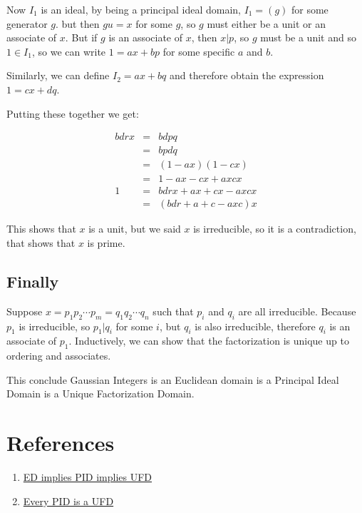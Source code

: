 \documentclass{article}
\begin{document}
Now $ I_1 $ is an ideal, by being a principal ideal domain, $ I_1 = (g) $ for some generator $ g $. but then $ gu = x $ for some $ g $, so $ g $ must either be a unit or an associate of $ x $. But if $ g $ is an associate of $ x $, then $ x | p $, so $ g $ must be a unit and so $ 1 \in I_1 $, so we can write $ 1 = ax + bp $ for some specific $ a $ and $ b $.

Similarly, we can define $ I_2 = {ax + bq} $ and therefore obtain the expression $ 1 = cx + dq $.

Putting these together we get:

\begin{eqnarray*}
  bdrx &=& bdpq                  \\
       &=& bpdq                  \\
       &=& (1-ax)(1-cx)          \\
       &=& 1 - ax - cx + axcx    \\
     1 &=& bdrx + ax + cx - axcx \\
       &=& (bdr + a + c - axc)x
\end{eqnarray*}

This shows that $ x $ is a unit, but we said $ x $ is irreducible, so it is a contradiction, that shows that $ x $ is prime.

\subsection*{Finally}
Suppose $ x = p_1 p_2 \cdots p_m = q_1 q_2 \cdots q_n $ such that $ p_i $ and $ q_i $ are all irreducible. Because $ p_1 $ is irreducible, so $ p_1 | q_i $ for some $ i $, but $ q_i $ is also irreducible, therefore $ q_i $ is an associate of $ p_1 $. Inductively, we can show that the factorization is unique up to ordering and associates.

This conclude Gaussian Integers is an Euclidean domain is a Principal Ideal Domain is a Unique Factorization Domain.

\section*{References}
\begin{enumerate}
    \item{\href{https://crypto.stanford.edu/pbc/notes/numberfield/edpidufd.html}{ED implies PID implies UFD}}
    \item{\href{https://planetmath.org/everypidisaufd}{Every PID is a UFD}}
\end{enumerate}
\end{document}
